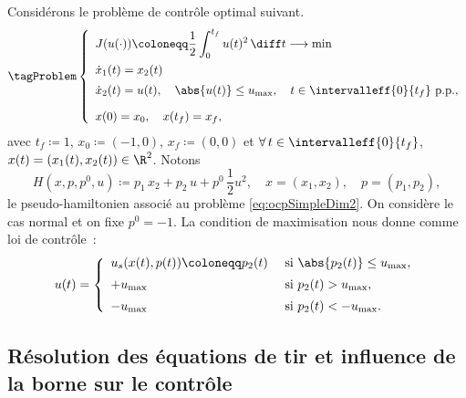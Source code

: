 Consid\'erons le probl\`eme de contr\^ole optimal suivant.
\leqnomode
\begin{equation}
\tagProblem
    \left\{ 
        \begin{array}{l}
            \displaystyle J(u(\cdot)) \coloneqq \displaystyle \frac{1}{2} \int_0^{t_f} u(t)^2 \, \diff t\longrightarrow \min            \\[1.0em]
            \dot{x}_1(t)    =  \displaystyle x_2(t)                                                                                     \\[0.5em]
            \dot{x}_2(t)    =  \displaystyle u(t), \quad \abs{u(t)} \le u_\mathrm{max}, \quad t \in \intervalleff{0}{t_f} \text{ p.p.}, \\[1.0em]
            x(0) = x_0 , \quad x(t_f) = x_f,
        \end{array}
    \right. 
    \label{eq:ocpSimpleDim2}
\end{equation}
\reqnomode
avec $t_f \coloneqq 1$, $x_0 \coloneqq (-1,0)$, $x_f \coloneqq (0,0)$ et $\forall\, t \in\intervalleff{0}{t_f}$, $x(t) = (x_1(t), x_2(t)) \in \R^2$.
Notons 
\[
    H(x,p,p^0,u) \coloneqq p_1\, x_2 + p_2\, u + p^0\, \frac{1}{2} u^2, \quad x = (x_1, x_2), \quad p = (p_1, p_2),
\]
le pseudo-hamiltonien associ\'e au probl\`eme \eqref{eq:ocpSimpleDim2}. On consid\`ere le cas normal et on fixe $p^0 = -1$. La condition de maximisation
nous donne comme loi de contr\^ole~:
\begin{equation}
    u(t) = 
    \left\{
        \begin{array}{ll}
            u_s(x(t),p(t)) \coloneqq p_2(t)   & \text{ si } \abs{p_2(t)} \le u_\mathrm{max}, \\[0.5em]
            +u_\mathrm{max}                      & \text{ si } p_2(t) > u_\mathrm{max}, \\[0.5em]
            -u_\mathrm{max}                      & \text{ si } p_2(t) < -u_\mathrm{max}.
        \end{array}
    \right.
    \label{eq:controleOCPSimpleDim2}
\end{equation}

\subsection{R\'esolution des \'equations de tir et influence de la borne sur le contr\^ole}

